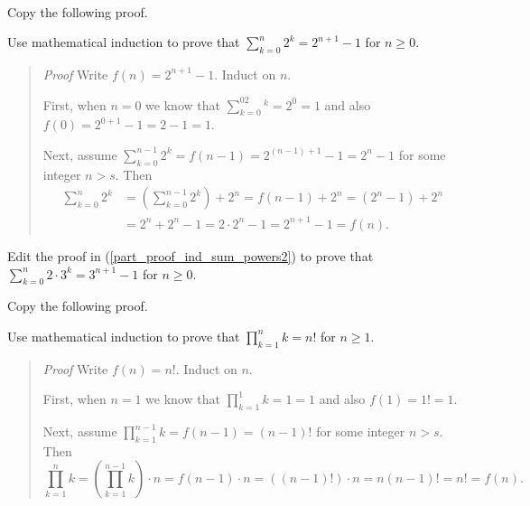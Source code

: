\begin{act}
\label{act_math_ind_sum_prod_formulas}  
~
    \begin{actpart}
        \item \label{part_proof_ind_sum_powers2} Copy the following proof.

            Use mathematical induction to prove that $\displaystyle \sum_{k=0}^n2^k=2^{n+1}-1$ for $n \ge 0$.  

            \begin{quote} 
                \emph{Proof} Write $f(n) = 2^{n+1}-1$.  Induct on $n$.
            
                First, when $n=0$ we know that $\displaystyle \sum_{k=0}^02^k=2^0=1$ and also $ f(0)=2^{0+1}-1=2-1=1.$
            
                Next, assume $\displaystyle \sum_{k=0}^{n-1}2^k=f(n-1)= 2^{(n-1)+1}-1=2^n-1$ for some integer $n > s$. Then 
                    \begin{align*}
                        \sum_{k=0}^n2^k & = \left(\sum_{k=0}^{n-1}2^k\right) + 2^n = f(n-1) + 2^n = \left(2^n-1\right)+2^n \\ 
                        & = 2^n+2^n-1=2\cdot2^n-1=2^{n+1}-1 = f(n).
                    \end{align*}
            \end{quote}
            
        \item Edit the proof in (\ref{part_proof_ind_sum_powers2}) to prove that $\displaystyle \sum_{k=0}^n2 \cdot 3^k = 3^{n+1}-1$ for $n\ge 0$.  

        \item \label{part_proof_ind_prod_recip} Copy the following proof.

            Use mathematical induction to prove that $\displaystyle \prod_{k=1}^nk=n!$ for $n \ge 1$.  
       
            \begin{quote} 
                \emph{Proof} Write $f(n) = n!$.  Induct on $n$.
            
                First, when $n=1$ we know that $\displaystyle \prod_{k=1}^1k=1=1$ and also $ f(1)=1!=1.$
            
                Next, assume $\displaystyle \prod_{k=1}^{n-1}k=f(n-1)= (n-1)!$ for some integer $n > s$. Then 
                    $$\prod_{k=1}^nk 
                    = \left(\prod_{k=1}^{n-1}k\right) \cdot n
                    = f(n-1) \cdot n  
                    = \left((n-1)!\right) \cdot n
                    = n(n-1)!
                    =n!
                    = f(n).$$
            \end{quote}
            

\end{actpart}
\end{act}
